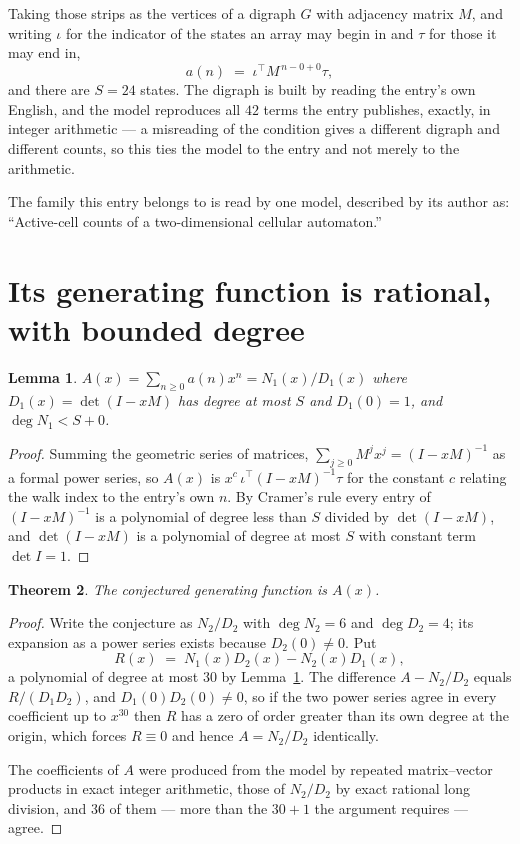 \documentclass[11pt,a4paper]{article}
\theoremstyle{plain}
\newtheorem{theorem}{Theorem}
\newtheorem{lemma}[theorem]{Lemma}
\theoremstyle{definition}
\begin{document}
Taking those strips as the vertices of a digraph $G$ with adjacency matrix $M$, and writing
$\iota$ for the indicator of the states an array may begin in and $\tau$ for those it may end
in,
\[
a(n)\;=\;\iota^{\!\top}M^{\,n-0+0}\tau ,
\]
and there are $S=24$ states. The digraph is built by reading the entry's own English, and the
model reproduces all $42$ terms the entry publishes, exactly, in integer arithmetic --- a
misreading of the condition gives a different digraph and different counts, so this ties the
model to the entry and not merely to the arithmetic.

The family this entry belongs to is read by one model, described by its author as: ``Active-cell counts of a two-dimensional cellular automaton.''


\section{Its generating function is rational, with bounded degree}

\begin{lemma}\label{lem:rat}
$A(x)=\sum_{n\ge0}a(n)x^n=N_1(x)/D_1(x)$ where $D_1(x)=\det(I-xM)$ has degree at most
$S$ and $D_1(0)=1$, and $\deg N_1<S+0$.
\end{lemma}

\begin{proof}
Summing the geometric series of matrices, $\sum_{j\ge0}M^jx^j=(I-xM)^{-1}$ as a formal
power series, so $A(x)$ is $x^{c}\,\iota^{\!\top}(I-xM)^{-1}\tau$ for the constant $c$
relating the walk index to the entry's own $n$. By Cramer's rule every entry of
$(I-xM)^{-1}$ is a polynomial of degree less than $S$ divided by $\det(I-xM)$, and
$\det(I-xM)$ is a polynomial of degree at most $S$ with constant term $\det I=1$.
\end{proof}

\begin{theorem}
The conjectured generating function is $A(x)$.
\end{theorem}

\begin{proof}
Write the conjecture as $N_2/D_2$ with $\deg N_2=6$ and $\deg D_2=4$; its expansion as a
power series exists because $D_2(0)\neq0$. Put
\[
R(x)\;=\;N_1(x)D_2(x)-N_2(x)D_1(x),
\]
a polynomial of degree at most $30$ by Lemma~\ref{lem:rat}. The difference
$A-N_2/D_2$ equals $R/(D_1D_2)$, and $D_1(0)D_2(0)\neq0$, so if the two power series agree in
every coefficient up to $x^{30}$ then $R$ has a zero of order greater than its own
degree at the origin, which forces $R\equiv0$ and hence $A=N_2/D_2$ identically.

The coefficients of $A$ were produced from the model by repeated matrix--vector products in
exact integer arithmetic, those of $N_2/D_2$ by exact rational long division, and $36$
of them --- more than the $30+1$ the argument requires --- agree.
\end{proof}
\end{document}
